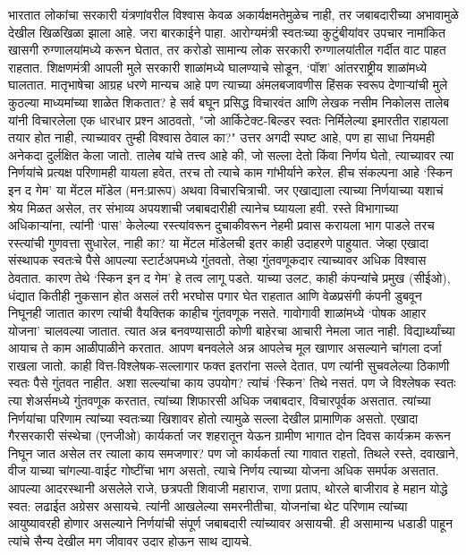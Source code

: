भारतात लोकांचा सरकारी यंत्रणांवरील विश्वास केवळ अकार्यक्षमतेमुळेच नाही, तर जबाबदारीच्या अभावामुळे देखील खिळखिळा झाला आहे. जरा बारकाईने पाहा. आरोग्यमंत्री स्वतःच्या कुटुंबीयांवर उपचार नामांकित खासगी रुग्णालयांमध्ये करून घेतात, तर करोडो सामान्य लोक सरकारी रुग्णालयांतील गर्दीत वाट पाहत राहतात. शिक्षणमंत्री आपली मुले सरकारी शाळांमध्ये घालण्याचे सोडून, ‘पॉश’ आंतरराष्ट्रीय शाळांमध्ये घालतात. मातृभाषेचा आग्रह धरणे मान्यच आहे पण त्याच्या अंमलबजावणीस हिंसक स्वरूप देणाऱ्यांची मुले कुठल्या माध्यमांच्या शाळेत शिकतात? हे सर्व बघून प्रसिद्ध विचारवंत आणि लेखक नसीम निकोलस तालेब यांनी विचारलेला एक धारधार प्रश्न आठवतो, "जो आर्किटेक्ट-बिल्डर स्वतः निर्मिलेल्या इमारतीत राहायला तयार होत नाही, त्याच्यावर तुम्ही विश्वास ठेवाल का?" उत्तर अगदी स्पष्ट आहे, पण हा साधा नियमही अनेकदा दुर्लक्षित केला जातो. तालेब यांचे तत्त्व आहे की, जो सल्ला देतो किंवा निर्णय घेतो, त्याच्यावर त्या निर्णयांचे प्रत्यक्ष परिणामही यायला हवेत, तरच तो त्याचे काम गांभीर्याने करेल. हीच संकल्पना आहे ‘स्किन इन द गेम’ या मेंटल मॉडेल (मन:प्रारूप) अथवा विचारचित्राची. जर एखाद्याला त्याच्या निर्णयाच्या यशाचं श्रेय मिळत असेल, तर संभाव्य अपयशाची जबाबदारीही त्यानेच घ्यायला हवी. रस्ते विभागाच्या अधिकाऱ्यांना, त्यांनी ‘पास’ केलेल्या रस्त्यांवरून दुचाकीवरून नेहमी प्रवास करायला भाग पाडले तरच रस्त्यांची गुणवत्ता सुधारेल, नाही का? या मेंटल मॉडेलची इतर काही उदाहरणे पाहुयात. 
जेव्हा एखादा संस्थापक स्वतःचे पैसे आपल्या स्टार्टअपमध्ये गुंतवतो, तेव्हा गुंतवणूकदार त्याच्यावर अधिक विश्वास ठेवतात. कारण तेथे ‘स्किन इन द गेम’ हे तत्व लागू पडते. याच्या उलट, काही कंपन्यांचे प्रमुख (सीईओ), धंद्यात कितीही नुकसान होत असलं तरी भरघोस पगार घेत राहतात आणि वेळप्रसंगी कंपनी डुबवून निघूनही जातात कारण त्यांची वैयक्तिक काहीच गुंतवणूक नसते. 
गावोगावी शाळांमध्ये ‘पोषक आहार योजना’ चालवल्या जातात. त्यात अन्न  बनवण्यासाठी कोणी बाहेरचा आचारी नेमला जात नाही. विद्यार्थ्यांच्या आयाच ते काम आळीपाळीने करतात. आपण बनवलेले अन्न  आपलेच मूल खाणार असल्याने चांगला दर्जा राखला जातो. 
काही वित्त-विश्लेषक-सल्लागार फक्त इतरांना सल्ले देतात, पण त्यांनी सुचवलेल्या ठिकाणी स्वतः  पैसे गुंतवत नाहीत. अशा सल्ल्यांचा काय उपयोग? त्यांचं ‘स्किन’ तिथे नसतं. पण जे विश्लेषक स्वतः त्या शेअर्समध्ये गुंतवणूक करतात, त्यांच्या शिफारसी अधिक जबाबदार, विचारपूर्वक असतात. त्यांच्या निर्णयांचा परिणाम त्यांच्या स्वतःच्या खिशावर होतो  त्यामुळे सल्ला देखील प्रामाणिक असतो.
एखादा गैरसरकारी संस्थेचा (एनजीओ) कार्यकर्ता जर शहरातून येऊन ग्रामीण भागात दोन दिवस कार्यक्रम करून निघून जात असेल तर त्याला काय समजणार? पण जो कार्यकर्ता त्या गावात राहतो, तिथले रस्ते, दवाखाने, वीज याच्या चांगल्या-वाईट गोष्टींचा भाग असतो, त्याचे निर्णय त्याच्या योजना अधिक समर्पक असतात.
आपल्या आदरस्थानी असलेले राजे, छत्रपती शिवाजी महाराज, राणा प्रताप, थोरले बाजीराव हे महान योद्धे स्वत: लढाईत अग्रेसर असायचे. त्यांनी आखलेल्या समरनीतीचा, योजनांचा थेट परिणाम त्यांच्या आयुष्यावरही होणार असल्याने निर्णयांची संपूर्ण जबाबदारी त्यांच्यावर असायची. ही असामान्य धडाडी पाहून त्यांचे सैन्य देखील मग जीवावर उदार होऊन साथ द्यायचे. 
